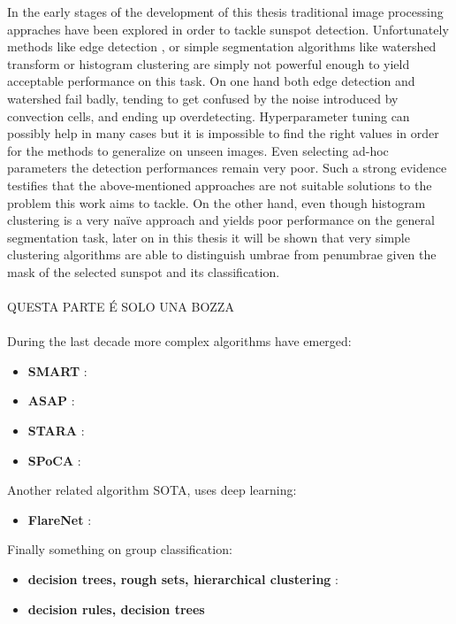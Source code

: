 In the early stages of the development of this thesis traditional image processing appraches have been explored in order to tackle sunspot detection. Unfortunately methods like edge detection \cite{canny1987computational}, or simple segmentation algorithms like watershed transform \cite{beucher1992watershed} or histogram clustering \cite{puzicha1999histogram} are simply not powerful enough to yield acceptable performance on this task. On one hand both edge detection and watershed fail badly, tending to get confused by the noise introduced by convection cells, and ending up overdetecting. Hyperparameter tuning can possibly help in many cases but it is impossible to find the right values in order for the methods to generalize on unseen images. Even selecting ad-hoc parameters the detection performances remain very poor. Such a strong evidence testifies that the above-mentioned approaches are not suitable solutions to the problem this work aims to tackle. On the other hand, even though histogram clustering is a very na\"{i}ve approach and yields poor performance on the general segmentation task, later on in this thesis it will be shown that very simple clustering algorithms are able to distinguish umbrae from penumbrae given the mask of the selected sunspot and its classification.\\ \\
QUESTA PARTE \'{E} SOLO UNA BOZZA \\ \\
During the last decade more complex algorithms have emerged:
\begin{itemize}
  \item \textbf{SMART} \cite{higgins2011solar}:
  \item \textbf{ASAP} \cite{colak2009automated}:
  \item \textbf{STARA} \cite{watson2009modelling}:
  \item \textbf{SPoCA} \cite{barra2009fast}:
\end{itemize}
Another related algorithm SOTA, uses deep learning:
\begin{itemize}
  \item \textbf{FlareNet} \cite{McGregor2017}:
\end{itemize} 
Finally something on group classification:
\begin{itemize}
  \item \textbf{decision trees, rough sets, hierarchical clustering} \cite{nguyen2006learning}:
  \item \textbf{decision rules, decision trees} \cite{colak2007automatic}
\end{itemize}
